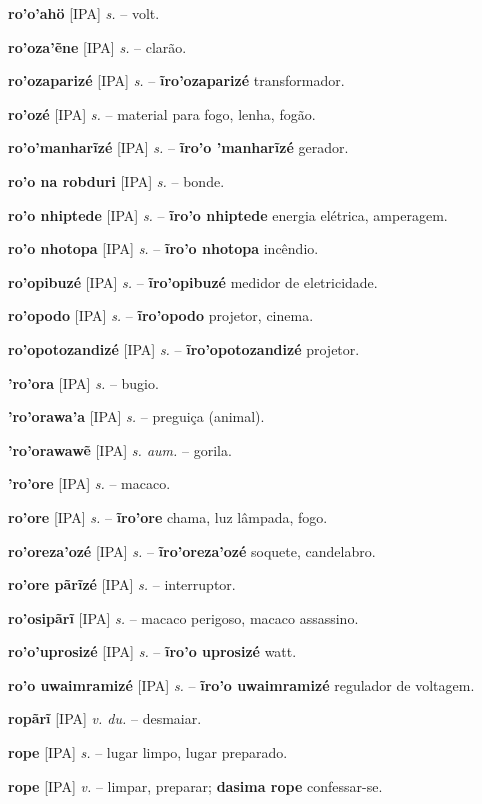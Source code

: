 \textbf{ro'o'ahö} [IPA] \textit{s.} -- volt.

\textbf{ro'oza'ẽne} [IPA] \textit{s.} -- clarão.

\textbf{ro'ozaparizé} [IPA] \textit{s.} -- \textbf{ĩro'ozaparizé} transformador.

\textbf{ro'ozé} [IPA] \textit{s.} -- material para fogo, lenha, fogão.

\textbf{ro'o'manharĩzé} [IPA] \textit{s.} -- \textbf{ĩro'o 'manharĩzé} gerador.

\textbf{ro'o na robduri} [IPA] \textit{s.} -- bonde.

\textbf{ro'o nhiptede} [IPA] \textit{s.} -- \textbf{ĩro'o nhiptede} energia elétrica, amperagem.

\textbf{ro'o nhotopa} [IPA] \textit{s.} -- \textbf{ĩro'o nhotopa} incêndio.

\textbf{ro'opibuzé} [IPA] \textit{s.} -- \textbf{ĩro'opibuzé} medidor de eletricidade.

\textbf{ro'opodo} [IPA] \textit{s.} -- \textbf{ĩro'opodo} projetor, cinema.

\textbf{ro'opotozandizé} [IPA] \textit{s.} -- \textbf{ĩro'opotozandizé} projetor.

\textbf{'ro'ora} [IPA] \textit{s.} -- bugio.

\textbf{'ro'orawa'a} [IPA] \textit{s.} -- preguiça (animal).

\textbf{'ro'orawawẽ} [IPA] \textit{s. aum.} -- gorila.

\textbf{'ro'ore} [IPA] \textit{s.} -- macaco.

\textbf{ro'ore} [IPA] \textit{s.} -- \textbf{ĩro'ore} chama, luz lâmpada, fogo.

\textbf{ro'oreza'ozé} [IPA] \textit{s.} -- \textbf{ĩro'oreza'ozé} soquete, candelabro.

\textbf{ro'ore pãrĩzé} [IPA] \textit{s.} -- interruptor.

\textbf{ro'osipãrĩ} [IPA] \textit{s.} -- macaco perigoso, macaco assassino.

\textbf{ro'o'uprosizé} [IPA] \textit{s.} -- \textbf{ĩro'o uprosizé} watt.

\textbf{ro'o uwaimramizé} [IPA] \textit{s.} -- \textbf{ĩro'o uwaimramizé} regulador de voltagem.

\textbf{ropãrĩ} [IPA] \textit{v. du.} -- desmaiar.

\textbf{rope} [IPA] \textit{s.} -- lugar limpo, lugar preparado.

\textbf{rope} [IPA] \textit{v.} -- limpar, preparar; \textbf{dasima rope} confessar-se.


